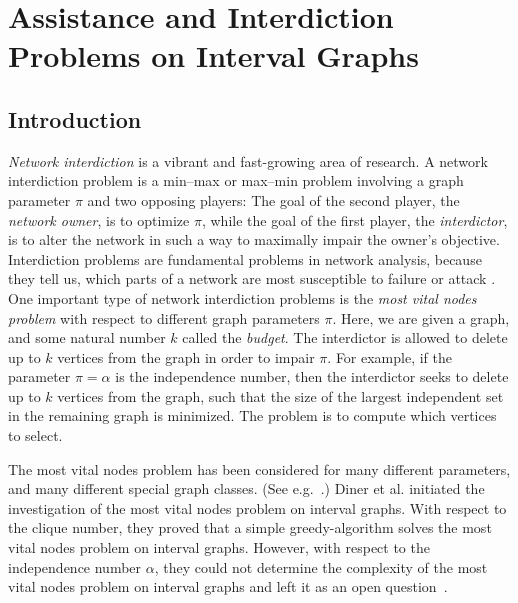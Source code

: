 




\chapter{Assistance and Interdiction Problems on Interval Graphs}
\label{ch:interdiction}

\section{Introduction}


\emph{Network interdiction} \cite{NetworkInterdictProblemsBookChapter} is a vibrant and fast-growing area of research. 
A network interdiction problem is a min–max or max–min problem 
involving a graph parameter $\pi$ and two opposing players: 
The goal of the second player, the \emph{network owner}, is to optimize $\pi$, while the goal of the first player, the \emph{interdictor}, 
is to alter the network in such a way to maximally impair the owner's objective. 
Interdiction problems are fundamental problems in network 
analysis, because they tell us, which parts of a network are most susceptible 
to failure or attack \cite{criticalNodeDetectionSurvey}. 
One important type of network interdiction problems
is the \emph{most vital nodes problem} with respect to different graph parameters $\pi$. 
Here, we are given a graph, and some natural number $k$ called the \emph{budget}. The interdictor is allowed to delete up to $k$ vertices from the graph in order to impair $\pi$. For example, if the parameter $\pi = \alpha$ is the independence number, then the interdictor seeks to delete up to $k$ vertices from the graph, such that the size of the largest independent set in the remaining graph is minimized. The problem is to compute which vertices to select.

The most vital nodes problem has been considered for many different parameters, and many different special graph classes. (See e.g.\ \cite{baier2010length,complexityOfFindingMostVitalNodesShortestPath,mostVitalNodesWrtIndSet,mostVitalLinksNodes1982,mahdavi2014minimum}.) Diner et al. \cite{diner2018contractionDeletionBlockers} initiated the investigation of the most vital nodes problem on interval graphs. 
With respect to the clique number, they proved that a simple greedy-algorithm 
solves the most vital nodes problem on interval graphs. However, with respect to the independence number $\alpha$, they could not determine the complexity of the most vital nodes problem on interval graphs and left it as an open question~\cite[(Q2)]{diner2018contractionDeletionBlockers}.

